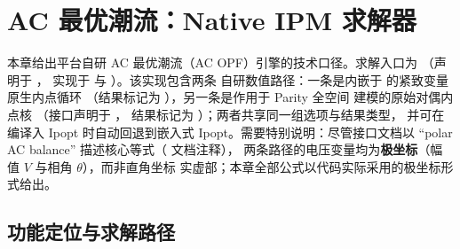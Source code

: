 \section{AC 最优潮流：Native IPM 求解器}\label{sec:acopfnative}

本章给出平台自研 AC 最优潮流（AC OPF）引擎的技术口径。求解入口为
\allowbreak{}\allowbreak （声明于
，
实现于  与
）。该实现包含两条
自研数值路径：一条是内嵌于  的紧致变量原生内点循环
（结果标记为 ），另一条是作用于 Parity 全空间
建模的原始对偶内点核 \allowbreak （接口声明于
，
结果标记为 ）；两者共享同一组选项与结果类型，
并可在编译入 Ipopt 时自动回退到嵌入式 Ipopt。需要特别说明：尽管接口文档以
``polar AC balance'' 描述核心等式（ 文档注释），
两条路径的电压变量均为\textbf{极坐标}（幅值 $V$ 与相角 $\theta$），而非直角坐标
实虚部；本章全部公式以代码实际采用的极坐标形式给出。

\subsection{功能定位与求解路径}\label{subsec:acopfnative:role}

